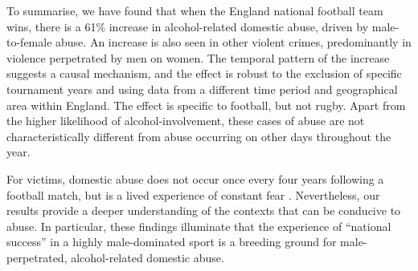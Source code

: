 \documentclass[12pt, a4paper]{article}
\begin{document}


To summarise, we have found that when the England national football team wins, there is a 61\% increase in alcohol-related domestic abuse, driven by male-to-female abuse. An increase is also seen in other violent crimes, predominantly in violence perpetrated by men on women. The temporal pattern of the increase suggests a causal mechanism, and the effect is robust to the exclusion of specific tournament years and using data from a different time period and geographical area within England. The effect is specific to football, but not rugby. Apart from the higher likelihood of alcohol-involvement, these cases of abuse are not characteristically different from abuse occurring on other days throughout the year. 

For victims, domestic abuse does not occur once every four years following a football match, but is a lived experience of constant fear \cite{Brooks-Hay2018}. Nevertheless, our results provide a deeper understanding of the contexts that can be conducive to abuse. In particular, these findings illuminate that the experience of ``national success'' in a highly male-dominated sport is a breeding ground for male-perpetrated, alcohol-related domestic abuse.
\end{document}
